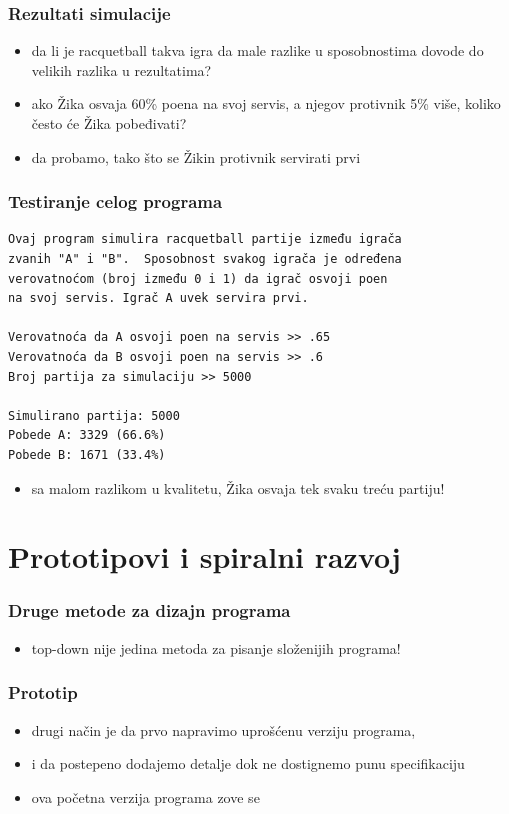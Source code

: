 \documentclass[utf8,compress]{beamer}
\begin{document}
\begin{frame}
  \frametitle{Rezultati simulacije}
\begin{itemize}
  \item da li je racquetball takva igra da male razlike u sposobnostima dovode do velikih razlika u rezultatima?
  \item ako Žika osvaja 60\% poena na svoj servis, a njegov protivnik 5\% više, koliko često će Žika pobeđivati?
  \item da probamo, tako što se Žikin protivnik servirati prvi
\end{itemize}
\end{frame}

\begin{frame}[fragile,shrink=5]
  \frametitle{Testiranje celog programa}
\begin{verbatim}
Ovaj program simulira racquetball partije između igrača
zvanih "A" i "B".  Sposobnost svakog igrača je određena
verovatnoćom (broj između 0 i 1) da igrač osvoji poen
na svoj servis. Igrač A uvek servira prvi.

Verovatnoća da A osvoji poen na servis >> .65
Verovatnoća da B osvoji poen na servis >> .6
Broj partija za simulaciju >> 5000

Simulirano partija: 5000
Pobede A: 3329 (66.6%)
Pobede B: 1671 (33.4%)
\end{verbatim}
\begin{itemize}
  \item sa malom razlikom u kvalitetu, Žika osvaja tek svaku treću partiju!
\end{itemize}
\end{frame}

\section[Prototipovi]{Prototipovi i spiralni razvoj}

\begin{frame}
  \frametitle{Druge metode za dizajn programa}
\begin{itemize}
  \item top-down nije jedina metoda za pisanje složenijih programa!
\end{itemize}
\end{frame}

\begin{frame}
  \frametitle{Prototip}
\begin{itemize}
  \item drugi način je da prvo napravimo uprošćenu verziju programa, 
  \item i da postepeno dodajemo detalje dok ne dostignemo punu specifikaciju
  \item ova početna verzija programa zove se 
\end{itemize}
\end{frame}
\end{document}

